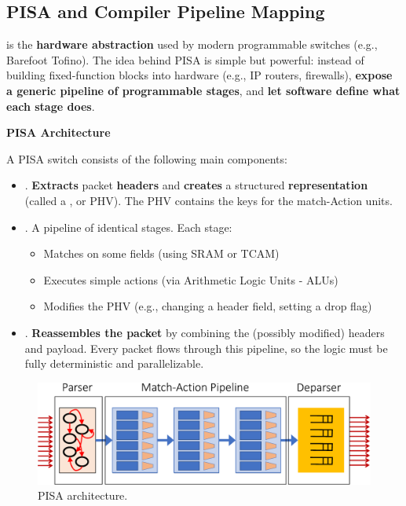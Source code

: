 \subsection{PISA and Compiler Pipeline Mapping}\label{subsection: PISA and Compiler Pipeline Mapping}

 is the \textbf{hardware abstraction} used by modern programmable switches (e.g., Barefoot Tofino). The idea behind PISA is simple but powerful: instead of building fixed-function blocks into hardware (e.g., IP routers, firewalls), \textbf{expose a generic pipeline of programmable stages}, and \textbf{let software define what each stage does}.

\highspace
\begin{flushleft}
    \textcolor{Green3}{ \textbf{PISA Architecture}}
\end{flushleft}
A PISA switch consists of the following main components:
\begin{itemize}
    \item {}. \textbf{Extracts} packet \textbf{headers} and \textbf{creates} a structured \textbf{representation} (called a , or PHV). The PHV contains the keys for the match-Action units.
    
    \item {}. A pipeline of identical stages. Each stage:
    \begin{itemize}
        \item Matches on some fields (using SRAM or TCAM)
        \item Executes simple actions (via Arithmetic Logic Units - ALUs)
        \item Modifies the PHV (e.g., changing a header field, setting a drop flag)
    \end{itemize}
    
    \item {}. \textbf{Reassembles the packet} by combining the (possibly modified) headers and payload. Every packet flows through this pipeline, so the logic must be fully deterministic and parallelizable.
\end{itemize}

\begin{figure}[!htp]
    \centering
    \includegraphics[width=\textwidth]{img/pisa-arch.pdf}
    \caption{PISA architecture.}
\end{figure}

